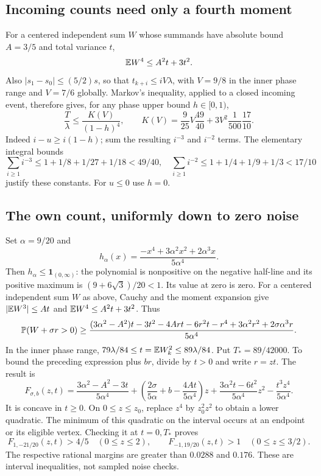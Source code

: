 \subsection{Incoming counts need only a fourth moment}
For a centered independent sum $W$ whose summands have absolute bound
$A=3/5$ and total variance $t$,
\[
                  \mathbb E W^4\le A^2t+3t^2.
\]
Also $|s_1-s_0|\le(5/2)s$, so that
$t_{k+i}\le iV\lambda$, with $V=9/8$ in the inner phase range and
$V=7/6$ globally. Markov's inequality, applied to a closed incoming event,
therefore gives, for any phase upper bound $h\in[0,1)$,
\begin{equation}\label{v10:smallnoise:tails}
 \frac{T}{\lambda}\le\frac{K(V)}{(1-h)^4},\qquad
 K(V)=\frac9{25}V\frac{49}{40}
                         +3V^2\frac1{500}\frac{17}{10}.
\end{equation}
Indeed $i-u\ge i(1-h)$; sum the resulting $i^{-3}$ and $i^{-2}$ terms.
The elementary integral bounds
\[
 \sum_{i\ge1}i^{-3}\le1+1/8+1/27+1/18<49/40,
 \quad
 \sum_{i\ge1}i^{-2}\le1+1/4+1/9+1/3<17/10
\]
justify these constants. For $u\le0$ use $h=0$.

\subsection{The own count, uniformly down to zero noise}
Set $\alpha=9/20$ and
\[
 h_\alpha(x)=\frac{-x^4+3\alpha^2x^2+2\alpha^3x}{5\alpha^4}.
\]
Then $h_\alpha\le\mathbf1_{(0,\infty)}$: the polynomial is nonpositive
on the negative half-line and its positive maximum is
$(9+6\sqrt3)/20<1$. Its value at zero is zero. For a centered independent
sum $W$ as above, Cauchy and the moment expansion give
$|\mathbb E W^3|\le At$ and $\mathbb E W^4\le A^2t+3t^2$. Thus
\[
 \mathbb P(W+\sigma r>0)\ge
 \frac{(3\alpha^2-A^2)t-3t^2-4Art-6r^2t-r^4
                         +3\alpha^2r^2+2\sigma\alpha^3r}{5\alpha^4}.
\]
In the inner phase range,
$79\lambda/84\le t=\mathbb E W_k^2\le89\lambda/84$.
Put $T_*=89/42000$. To bound the preceding expression plus $br$, divide
by $t>0$ and write $r=zt$. The result is
\[
 F_{\sigma,b}(z,t)=\frac{3\alpha^2-A^2-3t}{5\alpha^4}
 +\left(\frac{2\sigma}{5\alpha}+b-\frac{4At}{5\alpha^4}\right)z
 +\frac{3\alpha^2t-6t^2}{5\alpha^4}z^2
 -\frac{t^3z^4}{5\alpha^4}.
\]
It is concave in $t\ge0$. On $0\le z\le z_0$, replace $z^4$ by
$z_0^2z^2$ to obtain a lower quadratic. The minimum of this quadratic
on the interval occurs at an endpoint or its eligible vertex. Checking
it at $t=0,T_*$ proves
\[
 F_{1,-21/20}(z,t)>4/5\quad(0\le z\le2),\qquad
 F_{-1,19/20}(z,t)>1\quad(0\le z\le3/2).
\]
The respective rational margins are greater than $0.0288$ and $0.176$.
These are interval inequalities, not sampled noise checks.

